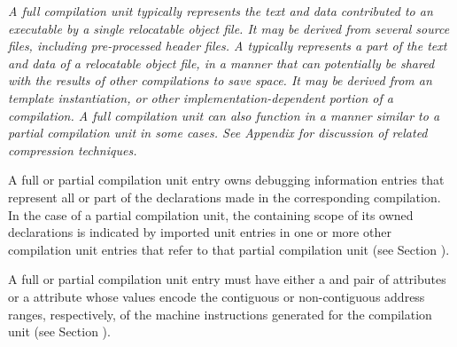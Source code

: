 \textit{A full compilation unit typically represents the text and
data contributed to an executable by a single relocatable
object file. It may be derived from several source files,
including pre-processed header files.
A  typically represents a part
of the text and data of a relocatable object file, in a manner that
can potentially be shared with the results of other compilations
to save space. It may be derived from an 
template instantiation, or other implementation-dependent
portion of a compilation. A full compilation unit can also
function in a manner similar to a partial compilation unit
in some cases.
See Appendix 
for discussion of related compression techniques.}

A full or partial
compilation unit entry owns debugging information
entries that represent all or part of the declarations
made in the corresponding compilation. In the case of a
partial compilation unit, the containing scope of its owned
declarations is indicated by imported unit entries in one
or more other compilation unit entries that refer to that
partial compilation unit (see
Section ).

\bb
A full or partial compilation unit entry must have
either a \DWATlowpc{} and \DWAThighpc{} pair of
attributes or a
\DWATranges{} attribute
whose values encode the contiguous or
non-contiguous address ranges, respectively,
of the machine instructions generated for the compilation
unit (see Section ).

